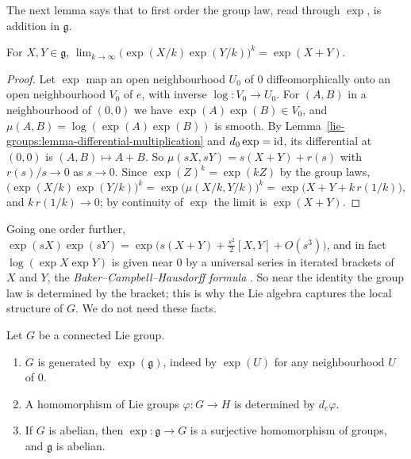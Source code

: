 The next lemma says that to first order the group law, read through $\exp$, is addition in $\mathfrak{g}$.

\begin{lemma}\label{lie-groups:lemma-product-formula}
For $X, Y \in \mathfrak{g}$, $\lim_{k \to \infty}\bigl(\exp(X/k)\exp(Y/k)\bigr)^k = \exp(X + Y)$.
\end{lemma}

\begin{proof}
Let $\exp$ map an open neighbourhood $U_0$ of $0$ diffeomorphically onto an open neighbourhood $V_0$ of $e$, with inverse $\log \colon V_0 \to U_0$. For
$(A, B)$ in a neighbourhood of $(0, 0)$ we have $\exp(A)\exp(B) \in V_0$, and $\mu(A, B) = \log(\exp(A)\exp(B))$ is smooth. By
Lemma~\ref{lie-groups:lemma-differential-multiplication} and $d_0\exp = \mathrm{id}$, its differential at $(0, 0)$ is $(A, B) \mapsto A + B$. So
$\mu(sX, sY) = s(X + Y) + r(s)$ with $r(s)/s \to 0$ as $s \to 0$. Since $\exp(Z)^k = \exp(kZ)$ by the group laws,
\[
\bigl(\exp(X/k)\exp(Y/k)\bigr)^k = \exp\bigl(\mu(X/k, Y/k)\bigr)^k = \exp\bigl(X + Y + k\,r(1/k)\bigr),
\]
and $k\,r(1/k) \to 0$; by continuity of $\exp$ the limit is $\exp(X + Y)$.
\end{proof}

\begin{remark}\label{lie-groups:remark-bch}
Going one order further, $\exp(sX)\exp(sY) = \exp\bigl(s(X + Y) + \tfrac{s^2}{2}[X, Y] + O(s^3)\bigr)$, and in fact
$\log(\exp X\exp Y)$ is given near $0$ by a universal series in iterated brackets of $X$ and $Y$, the \emph{Baker--Campbell--Hausdorff formula}
\cite[Chapter 1]{knapp-lie}. So near the identity the group law is determined by the bracket; this is why the Lie algebra captures the local structure of $G$.
We do not need these facts.
\end{remark}

\begin{proposition}\label{lie-groups:proposition-connected-generated}
Let $G$ be a connected Lie group.
\begin{enumerate}
\item $G$ is generated by $\exp(\mathfrak{g})$, indeed by $\exp(U)$ for any neighbourhood $U$ of $0$.
\item A homomorphism of Lie groups $\varphi \colon G \to H$ is determined by $d_e\varphi$.
\item If $G$ is abelian, then $\exp \colon \mathfrak{g} \to G$ is a surjective homomorphism of groups, and $\mathfrak{g}$ is abelian.
\end{enumerate}
\end{proposition}

